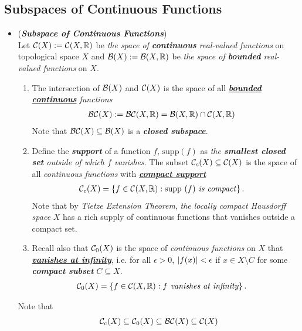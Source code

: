 \documentclass[11pt]{article}
\begin{document}
\subsection{Subspaces of Continuous Functions}
\begin{itemize}
\item \begin{definition} (\emph{\textbf{Subspace of Continuous Functions}})\\
Let ${\mathcal C}(X) := {\mathcal C}(X, {\mathbb R})$ be \emph{the space of \textbf{continuous} real-valued functions} on topological space $X$ and ${\mathcal B}(X): = {\mathcal B}(X, {\mathbb R})$ be \emph{the space of \textbf{bounded} real-valued functions} on $X$.
\begin{enumerate}
\item The intersection of  ${\mathcal B}(X)$ and ${\mathcal C}(X)$ is the space of all \emph{\underline{\textbf{bounded continuous}} functions}
\begin{align*}
{\mathcal B}{\mathcal C}(X) := \mathcal{BC}(X, {\mathbb R}) &= {\mathcal B}(X, {\mathbb R}) \cap {\mathcal C}(X, {\mathbb R})
\end{align*} Note that $\mathcal{BC}(X) \subseteq {\mathcal B}(X)$ is a \emph{\textbf{closed subspace}}. 

\item Define the \emph{\textbf{support}} of a function $f$, $\text{supp}(f)$ as  \emph{the \textbf{smallest closed set} outside of which  $f$ vanishes}. The subset ${\mathcal C}_{c}(X) \subseteq {\mathcal C}(X)$ is the space of all \emph{continuous functions} with \underline{\emph{\textbf{compact support}}}
\begin{align*}
{\mathcal C}_{c}(X) &= \left\{f \in {\mathcal C}(X, {\mathbb R}): \text{supp }(f) \text{\emph{ is compact}}\right\}.
\end{align*} Note that by \emph{Tietze Extension Theorem}, \emph{the locally compact Hausdorff space} $X$ has a rich supply of continuous functions that vanishes outside a compact set.

\item Recall also that ${\mathcal C}_{0}(X)$ is the space of \emph{continuous functions} on $X$ that \underline{\emph{\textbf{vanishes at infinity}}}, i.e. for all $\epsilon >0$, $\left\lvert f(x) \right\rvert < \epsilon$ if $x \in X\setminus C$ for some \emph{\textbf{compact subset}} $C \subseteq X$.
\begin{align*}
{\mathcal C}_{0}(X) &= \left\{f \in {\mathcal C}(X, {\mathbb R}): f \text{\emph{ vanishes at infinity}}\right\}.
\end{align*} 
\end{enumerate}
Note that 
\begin{align*}
{\mathcal C}_{c}(X)  \subseteq {\mathcal C}_{0}(X) \subseteq \mathcal{BC}(X) \subseteq {\mathcal C}(X)
\end{align*}
\end{definition}



\end{itemize}
\end{document}
